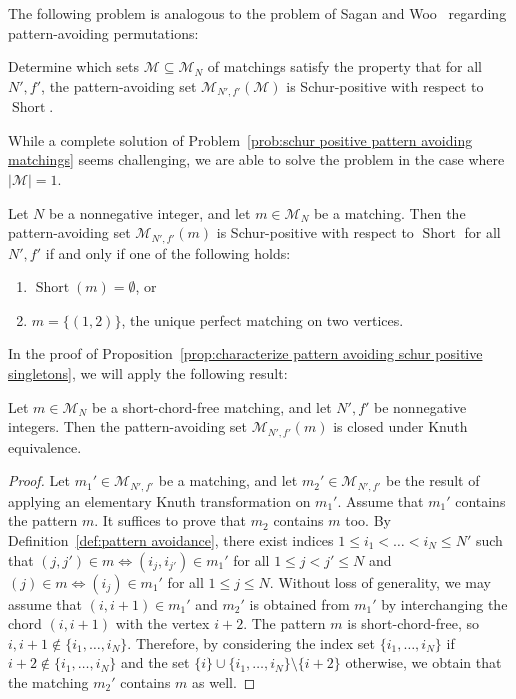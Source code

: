 \documentclass[ALCO]{cedram}
\newcommand{\Short}{\operatorname{Short}}
\newcommand{\M}{\mathcal{M}}
\begin{document}
The following problem is analogous to the problem of Sagan and Woo~\cite{problem_find_pattern} regarding pattern-avoiding permutations:

\begin{problem}
\label{prob:schur positive pattern avoiding matchings}
    Determine which sets $\M \subseteq \M_N$ of matchings satisfy the property that for all $N',f'$, the pattern-avoiding set $\M_{N',f'}(\M)$ is Schur-positive with respect to $\Short$.
\end{problem}

While a complete solution of Problem~\ref{prob:schur positive pattern avoiding matchings} seems challenging, we are able to solve the problem in the case where $|\M| = 1$.

\begin{proposition}
\label{prop:characterize pattern avoiding schur positive singletons}
    Let $N$ be a nonnegative integer, and let $m \in \M_N$ be a matching. Then the pattern-avoiding set $\M_{N',f'}(m)$ is Schur-positive with respect to $\Short$ for all $N',f'$ if and only if one of the following holds:
    \begin{enumerate}
        \item $\Short(m) = \emptyset$, or
        \item $m=\{(1,2)\}$, the unique perfect matching on two vertices.
    \end{enumerate}
\end{proposition}

In the proof of Proposition~\ref{prop:characterize pattern avoiding schur positive singletons}, we will apply the following result:
\begin{lemma}
\label{lem:avoiding set of short chord free matching is knuth like closed}
    Let $m \in \M_N$ be a short-chord-free matching, and let $N',f'$ be nonnegative integers. Then the pattern-avoiding set $\M_{N',f'}(m)$ is closed under Knuth equivalence.
\end{lemma}
\begin{proof}
    Let $m_1' \in \M_{N',f'}$ be a matching, and let $m_2' \in \M_{N',f'}$ be the result of applying an elementary Knuth transformation on $m_1'$. Assume that $m_1'$ contains the pattern $m$. It suffices to prove that $m_2$ contains $m$ too. By Definition~\ref{def:pattern avoidance}, there exist indices $1 \le i_1 < \dots < i_{N} \le N'$ such that $(j,j') \in m \Longleftrightarrow (i_j,i_{j'}) \in m_1'$ for all $1 \le j < j' \le N$ and $(j) \in m \Longleftrightarrow (i_j) \in m_1'$ for all $1 \le j \le N$. Without loss of generality, we may assume that $(i,i+1) \in m_1'$ and $m_2'$ is obtained from $m_1'$ by interchanging the chord $(i,i+1)$ with the vertex $i+2$. The pattern $m$ is short-chord-free, so $i, i+1 \notin \{i_1,\dots,i_N\}$. Therefore,
    by considering the index set $\{i_1,\dots,i_N\}$ if $i+2 \notin \{i_1,\dots,i_N\}$ and the set $\{i\}\cup\{i_1,\dots,i_N\} \setminus \{i+2\}$ otherwise, we obtain that the matching $m_2'$ contains $m$ as well.
\end{proof}
\end{document}
